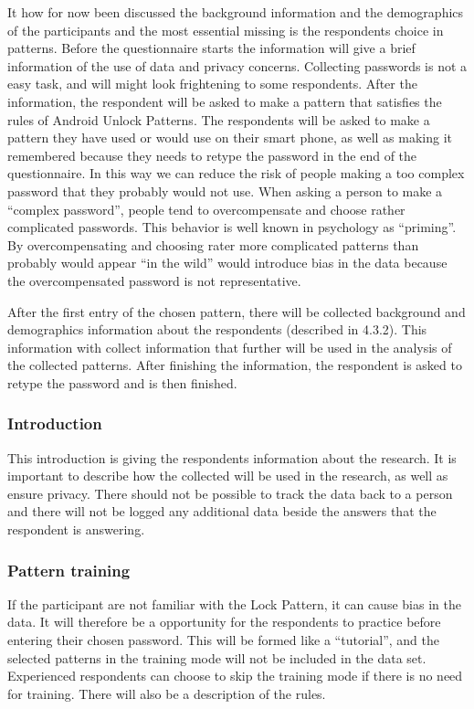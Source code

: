     It how for now been discussed the background information and the demographics of the participants and the most essential missing is the respondents choice in patterns. Before the questionnaire starts the information will give a brief information of the use of data and privacy concerns. Collecting passwords is not a easy task, and will might look frightening to some respondents. After the information, the respondent will be asked to make a pattern that satisfies the rules of Android Unlock Patterns. The respondents will be asked to make a pattern they have used or would use on their smart phone, as well as making it remembered because they needs to retype the password in the end of the questionnaire. In this way we can reduce the risk of people making a too complex password that they probably would not use. When asking a person to make a ``complex password'', people tend to overcompensate and choose rather complicated passwords. This behavior is well known in psychology as ``priming''. By overcompensating and choosing rater more complicated patterns than probably would appear ``in the wild'' would introduce bias in the data because the overcompensated password is not representative. 

    After the first entry of the chosen pattern, there will be collected background and demographics information about the respondents (described in 4.3.2). This information with collect information that further will be used in the analysis of the collected patterns. After finishing the information, the respondent is asked to retype the password and is then finished.     

    \subsubsection*{Introduction}
    This introduction is giving the respondents information about the research. It is important to describe how the collected will be used in the research, as well as ensure privacy. There should not be possible to track the data back to a person and there will not be logged any additional data beside the answers that the respondent is answering. 

    \subsubsection*{Pattern training}
    If the participant are not familiar with the Lock Pattern, it can cause bias in the data. It will therefore be a opportunity for the respondents to practice before entering their chosen password. This will be formed like a ``tutorial'', and the selected patterns in the training mode will not be included in the data set. 
    Experienced respondents can choose to skip the training mode if there is no need for training. There will also be a description of the rules. 

